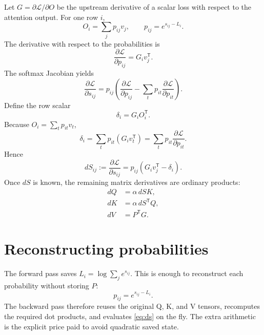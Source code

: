 Let $G = \partial \mathcal L / \partial O$ be the upstream derivative of a scalar loss with respect to the attention output. For one row $i$,
\begin{equation}
  O_i = \sum_j p_{ij} v_j,
  \qquad
  p_{ij} = e^{s_{ij}-L_i}.
\end{equation}
The derivative with respect to the probabilities is
\begin{equation}
  \frac{\partial \mathcal L}{\partial p_{ij}}
  = G_i v_j^{\mathsf T}.
  \label{eq:grad-p}
\end{equation}
The softmax Jacobian yields
\begin{equation}
  \frac{\partial \mathcal L}{\partial s_{ij}}
  = p_{ij}
    \left(
      \frac{\partial \mathcal L}{\partial p_{ij}}
      - \sum_t p_{it}\frac{\partial \mathcal L}{\partial p_{it}}
    \right).
\end{equation}
Define the row scalar
\begin{equation}
  \delta_i = G_i O_i^{\mathsf T}.
  \label{eq:delta-def}
\end{equation}
Because $O_i = \sum_t p_{it} v_t$,
\begin{equation}
  \delta_i
  = \sum_t p_{it} (G_i v_t^{\mathsf T})
  = \sum_t p_{it} \frac{\partial \mathcal L}{\partial p_{it}}.
\end{equation}
Hence
\begin{equation}
  dS_{ij}
  := \frac{\partial \mathcal L}{\partial s_{ij}}
  = p_{ij} \left(G_i v_j^{\mathsf T} - \delta_i\right).
  \label{eq:ds}
\end{equation}
Once $dS$ is known, the remaining matrix derivatives are ordinary products:
\begin{align}
  dQ &= \alpha\, dS K, \\
  dK &= \alpha\, dS^{\mathsf T} Q, \\
  dV &= P^{\mathsf T} G.
  \label{eq:dqdkdv}
\end{align}

\section{Reconstructing probabilities}

The forward pass saves $L_i = \log \sum_j e^{s_{ij}}$. This is enough to reconstruct each probability without storing $P$:
\begin{equation}
  p_{ij} = e^{s_{ij}-L_i}.
\end{equation}
The backward pass therefore reuses the original Q, K, and V tensors, recomputes the required dot products, and evaluates \eqref{eq:ds} on the fly. The extra arithmetic is the explicit price paid to avoid quadratic saved state.

